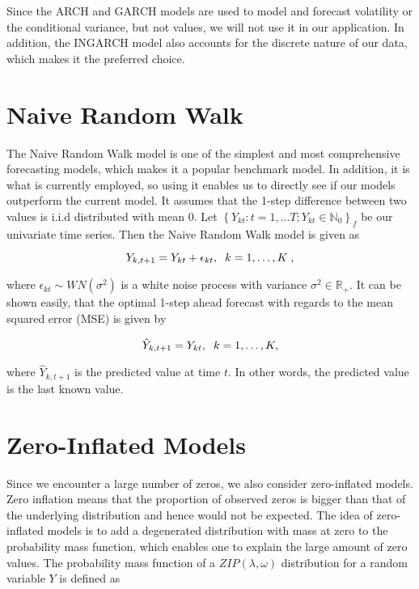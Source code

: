 Since the ARCH and GARCH models are used to model and forecast volatility or the conditional variance, but not values, we will not use it in our application. In addition, the INGARCH model also accounts for the discrete nature of our data, which makes it the preferred choice. 


\section{Naive Random Walk}
\label{sec: Naive Random Walk}

The Naive Random Walk model is one of the simplest and most comprehensive forecasting models, which makes it a popular benchmark model. In addition, it is what is currently employed, so using it enables us to directly see if our models outperform the current model. It assumes that the 1-step difference between two values is i.i.d distributed with mean 0. Let $\left\{Y_{kt}:t=1,\ldots T; Y_{kt} \in \mathbb{N}_0\right\}_f$ be our univariate time series. Then the Naive Random Walk model is given as

\begin{equation}
Y_{k,t+1}= Y_{kt} + \epsilon_{kt},\hspace{0.2cm} k=1,\ldots,K \hspace{0.1cm}, 
\label{eq: Random Walk Model}
\end{equation}
 
where $\epsilon_{kt} \sim WN(\sigma^2)$ is a white noise process with variance $\sigma^2 \in \mathbb{R}_+$. It can be shown easily, that the optimal 1-step ahead forecast with regards to the mean squared error (MSE) is given by

\begin{equation}
\hat{Y}_{k,t+1}= Y_{kt} ,\hspace{0.2cm} k=1,\ldots,K ,
\label{eq: Random Walk Model Prediction}
\end{equation}

where $\hat{Y}_{k,t+1}$ is the predicted value at time $t$. In other words, the predicted value is the last known value.  


\section{Zero-Inflated Models}
\label{sec: Zim}

Since we encounter a large number of zeros, we also consider zero-inflated models. Zero inflation means that the proportion of observed zeros is bigger than that of the underlying distribution and hence would not be expected. The idea of zero-inflated models is to add a degenerated distribution with mass at zero to the probability mass function, which enables one to explain the large amount of zero values. The probability mass function of a $ZIP(\lambda,\omega)$ distribution for a random variable $Y$ is defined as \cite{Zhu:2012}

